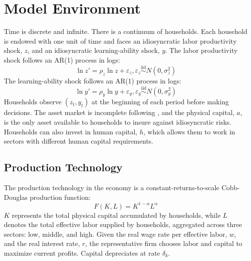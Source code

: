 \documentclass[12pt,english]{article}
\numberwithin{equation}{section}
\begin{document}
\section{Model Environment }
\label{sec:model}
Time is discrete and infinite. 
There is a continuum of households. Each household is endowed with one unit of time and faces an idiosyncratic labor productivity shock, $z$, and an idiosyncratic learning-ability shock, $y$. The labor productivity shock follows an AR(1) process in logs:
\begin{equation}
    \label{eq:z}
\ln z'=\rho_z\ln z + \varepsilon_z, \varepsilon_z \overset{\mathrm{iid}}{\sim} N(0,\sigma_z^2)
\end{equation}
The learning-ability shock follows an AR(1) process in logs:
\begin{equation}
    \label{eq:y}
\ln y'=\rho_y\ln y + \varepsilon_y, \varepsilon_y \overset{\mathrm{iid}}{\sim} N(0,\sigma_y^2)
\end{equation}
Households observe $(z_t,y_t)$ at the beginning of each period before making decisions.
The asset market is incomplete following \citet{aiyagari_uninsured_1994}, and the physical capital, $a$, is the only asset available to households to insure against idiosyncratic risks. Households can also invest in human capital, $h$, which allows them to work in sectors with different human capital requirements.

\subsection{Production Technology}
The production technology in the economy is a constant-returns-to-scale Cobb-Douglas production function:
\begin{equation}
    F(K,L)=K^{1-\alpha} L^{\alpha}
\end{equation}
$K$ represents the total physical capital accumulated by households, while $L$ denotes the total effective labor supplied by households, aggregated across three sectors: low, middle, and high. Given the real wage rate per effective labor, $w$, and the real interest rate, $r$, the representative firm chooses labor and capital to maximize current profits. Capital depreciates at rate $\delta_k$.
\end{document}
